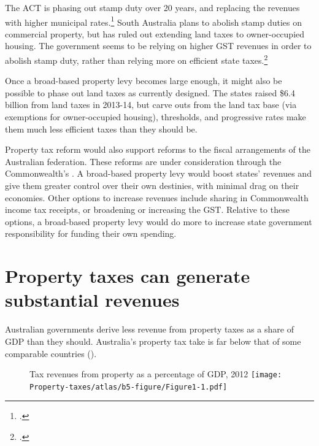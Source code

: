 \documentclass[twoside,english]{palatinob5portrait}
\begin{document}
The ACT is phasing out stamp duty over 20 years, and replacing the revenues with higher municipal rates.\footcites[][21]{ACT-Treasury2012-13-Budget-Papers}[][229]{ACT-Treasury2014-15-Budget-Papers}  South Australia plans to abolish stamp duties on commercial property, but has ruled out extending land taxes to owner-occupied housing. The government seems to be relying on higher GST revenues in order to abolish stamp duty, rather than relying more on efficient state taxes.\footcites{GovernmentSouthAustralia2015-Govt-response-to-State-Tax-Review}{DTF2015-State-Budget-Papers-201516} 

Once a broad-based property levy becomes large enough, it might also be possible to phase out land taxes as currently designed. The states raised \$6.4 billion from land taxes in 2013-14, but carve outs from the land tax base (via exemptions for owner-occupied housing), thresholds, and progressive rates make them much less efficient taxes than they should be. 

Property tax reform would also support reforms to the fiscal arrangements of the Australian federation. These reforms are under consideration through the Commonwealth’s 
.
A broad-based property levy would boost states’ revenues and give them greater control over their own destinies, with minimal drag on their economies. Other options to increase revenues include sharing in Commonwealth income tax receipts, or broadening or increasing the GST\@. Relative to these options, a broad-based property levy would do more to increase state government responsibility for funding their own spending. 


\chapter{Property taxes can generate substantial revenues}\label{chapter:PROP-3}
Australian governments derive less revenue from property taxes as a share of GDP than they should. Australia’s property tax take is far below that of some comparable countries ().

\begin{figure}
%
{Tax revenues from property as a percentage of GDP, 2012}
\texttt{[image: Property-taxes/atlas/b5-figure/Figure1-1.pdf]}

\end{figure}
\end{document}
